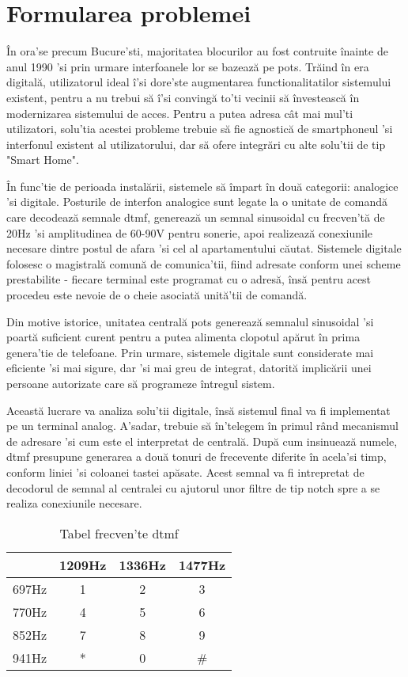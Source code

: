 \section {Formularea problemei}

În ora'se precum Bucure'sti, majoritatea blocurilor au fost contruite înainte de anul 1990 'si prin urmare interfoanele lor se bazează pe \acrshort{pots}. Trăind în era digitală, utilizatorul ideal î'si dore'ste augmentarea functionalitatilor sistemului existent, pentru a nu trebui să î'si convingă to'ti vecinii să învestească în modernizarea sistemului de acces. Pentru a putea adresa cât mai mul'ti utilizatori, solu'tia acestei probleme trebuie să fie agnostică de smartphoneul 'si interfonul existent al utilizatorului, dar să ofere integrări cu alte solu'tii de tip "Smart Home".

În func'tie de perioada instalării, sistemele să împart în două categorii: analogice 'si digitale. Posturile de interfon analogice sunt legate la o unitate de comandă care decodează semnale \acrfull{dtmf}, generează un semnal sinusoidal cu frecven'tă de 20Hz 'si amplitudinea de 60-90V pentru sonerie, apoi realizează conexiunile necesare dintre postul de afara 'si cel al apartamentului căutat. Sistemele digitale folosesc o magistrală comună de comunica'tii, fiind adresate conform unei scheme prestabilite - fiecare terminal este programat cu o adresă, însă pentru acest procedeu este nevoie de o cheie asociată unită'tii de comandă.

Din motive istorice, unitatea centrală \acrshort{pots} generează semnalul sinusoidal 'si poartă suficient curent pentru a putea alimenta clopotul apărut în prima genera'tie de telefoane. Prin urmare, sistemele digitale sunt considerate mai eficiente 'si mai sigure, dar 'si mai greu de integrat, datorită implicării unei persoane autorizate care să programeze întregul sistem.

Această lucrare va analiza solu'tii digitale, însă sistemul final va fi implementat pe un terminal analog. A'sadar, trebuie să în'telegem în primul rând mecanismul de adresare 'si cum este el interpretat de centrală. După cum insinuează numele, \acrshort{dtmf} presupune generarea a două tonuri de frecevente diferite în acela'si timp, conform liniei 'si coloanei tastei apăsate. Acest semnal va fi intrepretat de decodorul de semnal al centralei cu ajutorul unor filtre de tip notch spre a se realiza conexiunile necesare. 

\begin{table}[ht!]
\begin{tabular}{c||c|c|c}
 & 1209Hz & 1336Hz & 1477Hz \\
\hline
\hline
697Hz & 1 & 2 & 3 \\
\hline
770Hz & 4 & 5 & 6 \\
\hline
852Hz & 7 & 8 & 9 \\
\hline
941Hz & * & 0 & \# \\
\end{tabular}
\centering
\caption{Tabel frecven'te \acrshort{dtmf}}
\label{tab:dtmf}
\end{table}

